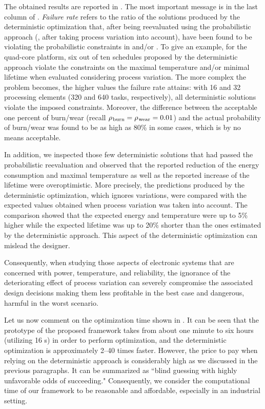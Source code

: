 The obtained results are reported in .
The most important message is in the last column of .
\emph{Failure rate} refers to the ratio of the solutions produced by the deterministic optimization that, after being reevaluated using the probabilistic approach (\ie, after taking process variation into account), have been found to be violating the probabilistic constraints in  and/or .
To give an example, for the quad-core platform, six out of ten schedules proposed by the deterministic approach violate the constraints on the maximal temperature and/or minimal lifetime when evaluated considering process variation.
The more complex the problem becomes, the higher values the failure rate attains: with 16 and 32 processing elements (320 and 640 tasks, respectively), all deterministic solutions violate the imposed constraints.
Moreover, the difference between the acceptable one percent of burn/wear (recall $\rho_{\text{\kern0.1emburn}} = \rho_{\text{\kern0.1emwear}} = 0.01$) and the actual probability of burn/wear was found to be as high as 80\% in some cases, which is by no means acceptable.

In addition, we inspected those few deterministic solutions that had passed the probabilistic reevaluation and observed that the reported reduction of the energy consumption and maximal temperature as well as the reported increase of the lifetime were overoptimistic.
More precisely, the predictions produced by the deterministic optimization, which ignores variations, were compared with the expected values obtained when process variation was taken into account.
The comparison showed that the expected energy and temperature were up to 5\% higher while the expected lifetime was up to 20\% shorter than the ones estimated by the deterministic approach.
This aspect of the deterministic optimization can mislead the designer.

Consequently, when studying those aspects of electronic systems that are concerned with power, temperature, and reliability, the ignorance of the deteriorating effect of process variation can severely compromise the associated design decisions making them less profitable in the best case and dangerous, harmful in the worst scenario.

Let us now comment on the optimization time shown in .
It can be seen that the prototype of the proposed framework takes from about one minute to six hours (utilizing 16 s) in order to perform optimization, and the deterministic optimization is approximately 2--40 times faster.
However, the price to pay when relying on the deterministic approach is considerably high as we discussed in the previous paragraphs.
It can be summarized as ``blind guessing with highly unfavorable odds of succeeding."
Consequently, we consider the computational time of our framework to be reasonable and affordable, especially in an industrial setting.

